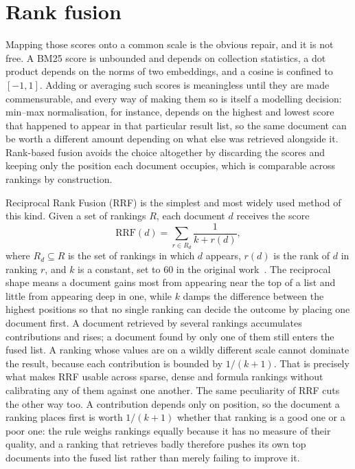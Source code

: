 \section{Rank fusion}\label{sec:bg-rank-fusion}

Mapping those scores onto a common scale is the obvious repair, and it is not
free. A BM25 score is unbounded and depends on collection statistics, a dot
product depends on the norms of two embeddings, and a cosine is confined to
$[-1,1]$. Adding or averaging such scores is meaningless until they are made
commensurable, and every way of making them so is itself a modelling decision:
min--max normalisation, for instance, depends on the highest and lowest score that
happened to appear in that particular result list, so the same document can be
worth a different amount depending on what else was retrieved alongside it.
Rank-based fusion avoids the choice altogether by discarding the scores and
keeping only the position each document occupies, which is comparable across
rankings by construction.

Reciprocal Rank Fusion (RRF) is the simplest and most widely used method of this
kind. Given a set of rankings $R$, each document $d$ receives the score
\begin{equation}
\mathrm{RRF}(d) = \sum_{r \in R_d} \frac{1}{k + r(d)},
\end{equation}
where $R_d \subseteq R$ is the set of rankings in which $d$ appears, $r(d)$ is the
rank of $d$ in ranking $r$, and $k$ is a constant, set to 60 in the original
work~\cite{cormack2009rrf}. The reciprocal shape means a document gains most from
appearing near the top of a list and little from appearing deep in one, while $k$
damps the difference between the highest positions so that no single ranking can
decide the outcome by placing one document first. A document
retrieved by several rankings accumulates contributions and rises; a document
found by only one of them still enters the fused list. A ranking whose values are on a
wildly different scale cannot dominate the result, because each contribution is
bounded by $1/(k+1)$. That is precisely what makes RRF usable across sparse,
dense and formula rankings without calibrating any of them against one another.
The same peculiarity of RRF cuts the other way too. A contribution depends only on
position, so the document a ranking places first is worth $1/(k+1)$ whether that
ranking is a good one or a poor one: the rule weighs rankings equally because it
has no measure of their quality, and a ranking that retrieves badly therefore
pushes its own top documents into the fused list rather than merely failing to
improve it.

